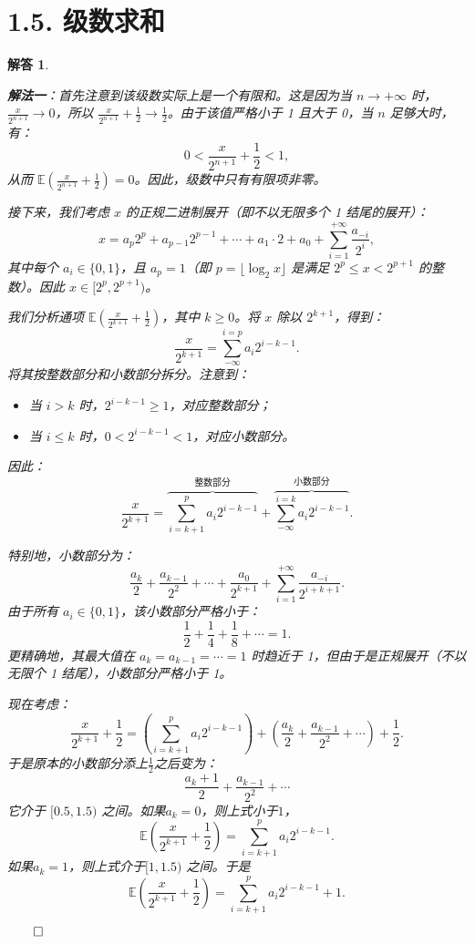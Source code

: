 \documentclass[12pt,UTF8]{ctexbook}
\theoremstyle{exercisestyle}
\theoremstyle{solutionstyle}
\newtheorem*{solution*}{解答}
\newenvironment{solution}
  {\begin{solution*}}
  {\hfill\ensuremath{\qed}\end{solution*}}
\begin{document}
\section{1.5. 级数求和}\label{calcul-dune-somme}
\begin{solution}
\begin{subquestions}
\item \textbf{解法一}：首先注意到该级数实际上是一个有限和。这是因为当 $n \to +\infty$ 时，$\frac{x}{2^{n+1}} \to 0$，所以 $\frac{x}{2^{n+1}} + \frac{1}{2} \to \frac{1}{2}$。由于该值严格小于 1 且大于 0，当 $n$ 足够大时，有：
$$
0 < \frac{x}{2^{n+1}} + \frac{1}{2} < 1,
$$
从而 $\mathbb{E}\left(\frac{x}{2^{n+1}} + \frac{1}{2}\right) = 0$。因此，级数中只有有限项非零。

接下来，我们考虑 $x$ 的正规二进制展开（即不以无限多个 1 结尾的展开）：
$$
x = a_p 2^p + a_{p-1} 2^{p-1} + \cdots + a_1 \cdot 2 + a_0 + \sum_{i=1}^{+\infty} \frac{a_{-i}}{2^i},
$$
其中每个 $a_i \in \{0,1\}$，且 $a_p = 1$（即 $p = \lfloor \log_2 x \rfloor$ 是满足 $2^p \leq x < 2^{p+1}$ 的整数）。因此 $x \in [2^p, 2^{p+1})$。

我们分析通项 $\mathbb{E}\left(\frac{x}{2^{k+1}} + \frac{1}{2}\right)$，其中 $k \geq 0$。将 $x$ 除以 $2^{k+1}$，得到：
$$
\frac{x}{2^{k+1}} = \sum_{-\infty}^{i=p} a_i 2^{i - k - 1}.
$$
将其按整数部分和小数部分拆分。注意到：
\begin{itemize}
    \item 当 $i > k$ 时，$2^{i - k - 1} \geqslant 1$，对应整数部分；
    \item 当 $i \leqslant k$ 时，$0 < 2^{i - k - 1} < 1$，对应小数部分。
\end{itemize}
因此：
$$
\frac{x}{2^{k+1}} = \overbrace{\sum_{i=k+1}^{p} a_i 2^{i - k - 1}}^{\text{整数部分}} + \overbrace{\sum_{-\infty}^{i=k} a_i 2^{i - k - 1}}^{\text{小数部分}}.
$$

特别地，小数部分为：
$$
\frac{a_k}{2} + \frac{a_{k-1}}{2^2} + \cdots + \frac{a_0}{2^{k+1}} + \sum_{i=1}^{+\infty} \frac{a_{-i}}{2^{i + k + 1}}.
$$
由于所有 $a_i \in \{0,1\}$，该小数部分严格小于：
$$
\frac{1}{2} + \frac{1}{4} + \frac{1}{8} + \cdots = 1.
$$
更精确地，其最大值在 $a_k = a_{k-1} = \cdots = 1$ 时趋近于 1，但由于是正规展开（不以无限个 1 结尾），小数部分严格小于 1。

现在考虑：
$$
\frac{x}{2^{k+1}} + \frac{1}{2} = \left( \sum_{i=k+1}^{p} a_i 2^{i - k - 1} \right) + \left( \frac{a_k}{2} + \frac{a_{k-1}}{2^2} + \cdots \right) + \frac{1}{2}.
$$
于是原本的小数部分添上$\frac{1}{2}$之后变为：
$$
 \frac{a_k + 1}{2} + \frac{a_{k-1}}{2^2} + \cdots 
$$
它介于 $[0.5, 1.5)$ 之间。如果$a_k = 0$，则上式小于$1$，
$$
\mathbb{E}\left(\frac{x}{2^{k+1}} + \frac{1}{2}\right) = \sum_{i=k+1}^{p} a_i 2^{i - k - 1}.
$$
如果$a_k = 1$，则上式介于$[1, 1.5)$ 之间。于是
$$
\mathbb{E}\left(\frac{x}{2^{k+1}} + \frac{1}{2}\right) = \sum_{i=k+1}^{p} a_i 2^{i - k - 1} + 1.
$$


\end{subquestions}
\end{solution}
\end{document}
